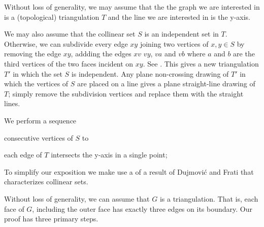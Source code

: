 \documentclass{patmorin}
\begin{document}
Without loss of generality, we may assume that the the graph we are
interested in is a (topological) triangulation $T$ and the line we are
interested in is the y-axis.  

We may also assume that the collinear set $S$ is an independent set in
$T$. Otherwise, we can subdivide every edge $xy$ joining two vertices
of $x,y\in S$ by removing the edge $xy$, addding the edges $xv$ $vy$,
$va$ and $vb$ where $a$ and $b$ are the third vertices of the two
faces incident on $xy$. See .  This gives a new
triangulation $T'$ in which the set $S$ is independent. Any plane
non-crossing drawing of $T'$ in which the vertices of $S$ are placed
on a line gives a plane straight-line drawing of $T$; simply remove the
subdivision vertices and replace them with the straight lines.

We perform a sequence 



consecutive vertices of $S$ to 

each edge of $T$ intersects the y-axis in a single point;




To simplify our exposition
we make use a of a result of Dujmovi\'c and Frati that characterizes
collinear sets.



Without loss of generality, we can assume that $G$ is a
triangulation. That is, each face of $G$, including the outer face has
exactly three edges on its boundary.  Our proof has three primary steps. 
\end{document}

